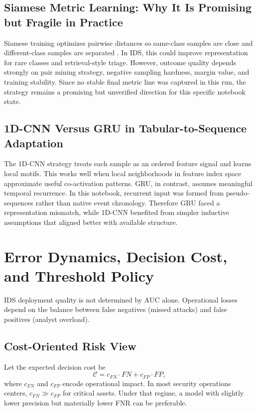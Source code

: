 \documentclass[10pt,journal]{IEEEtran}
\begin{document}
\subsection{Siamese Metric Learning: Why It Is Promising but Fragile in Practice}
Siamese training optimizes pairwise distances so same-class samples are close and different-class samples are separated \cite{koch2015siamese}. In IDS, this could improve representation for rare classes and retrieval-style triage. However, outcome quality depends strongly on pair mining strategy, negative sampling hardness, margin value, and training stability. Since no stable final metric line was captured in this run, the strategy remains a promising but unverified direction for this specific notebook state.

\subsection{1D-CNN Versus GRU in Tabular-to-Sequence Adaptation}
The 1D-CNN strategy treats each sample as an ordered feature signal and learns local motifs. This works well when local neighborhoods in feature index space approximate useful co-activation patterns. GRU, in contrast, assumes meaningful temporal recurrence. In this notebook, recurrent input was formed from pseudo-sequences rather than native event chronology. Therefore GRU faced a representation mismatch, while 1D-CNN benefited from simpler inductive assumptions that aligned better with available structure.

\section{Error Dynamics, Decision Cost, and Threshold Policy}
IDS deployment quality is not determined by AUC alone. Operational losses depend on the balance between false negatives (missed attacks) and false positives (analyst overload).

\subsection{Cost-Oriented Risk View}
Let the expected decision cost be
\begin{equation}
\mathcal{C} = c_{FN}\cdot FN + c_{FP}\cdot FP,
\end{equation}
where $c_{FN}$ and $c_{FP}$ encode operational impact. In most security operations centers, $c_{FN} \gg c_{FP}$ for critical assets. Under that regime, a model with slightly lower precision but materially lower FNR can be preferable.
\end{document}
